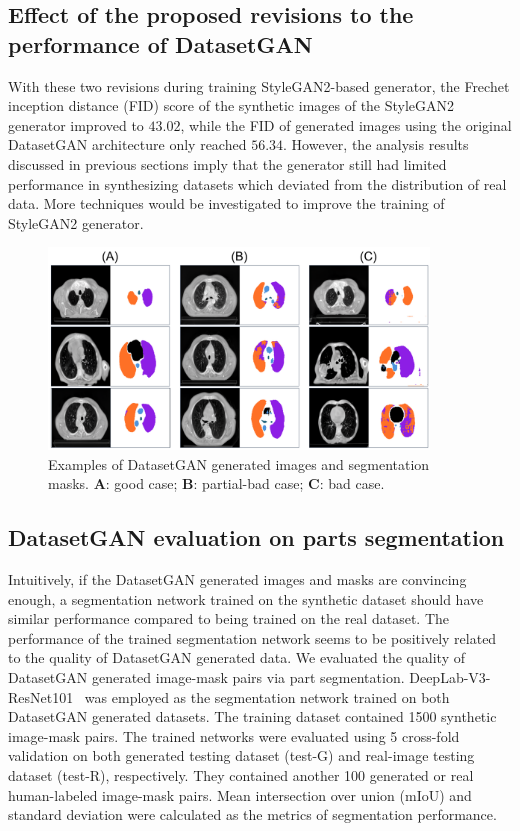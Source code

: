 \documentclass[conference]{IEEEtran}
\begin{document}
\subsection{Effect of the proposed revisions to the performance of DatasetGAN}
\label{sec:abl_datasetgan}
With these two revisions during training StyleGAN2-based generator, the Frechet inception distance (FID) score of the synthetic images of the StyleGAN2 generator improved to $43.02$, while the FID of generated images using the original DatasetGAN architecture only reached $56.34$.
However, the analysis results discussed in previous sections imply that the generator still had limited performance in synthesizing datasets which deviated from the distribution of real data. More techniques would be investigated to improve the training of StyleGAN2 generator.

\begin{figure}[h]
  \centering
  \includegraphics[width=0.9\textwidth]{./fig/generated_sample.png}
  \caption{Examples of DatasetGAN generated images and segmentation masks. \textbf{A}: good case; \textbf{B}: partial-bad case; \textbf{C}: bad case.}
  \label{fig:generated_data}
\end{figure}

\subsection{DatasetGAN evaluation on parts segmentation}
\label{sec:eval}
Intuitively, if the DatasetGAN generated images and masks are convincing enough, 
a segmentation network trained on the synthetic dataset should have similar performance compared to being trained on the real dataset. 
The performance of the trained segmentation network seems to be positively related to the quality of DatasetGAN generated data. 
We evaluated the quality of DatasetGAN generated image-mask pairs via part segmentation. DeepLab-V3-ResNet101~\cite{chen2017rethinking} was employed as the segmentation network trained on both DatasetGAN generated datasets. 
The training dataset contained 1500 synthetic image-mask pairs. The trained networks were evaluated using 5 cross-fold validation on both generated testing dataset (test-G) and real-image testing dataset (test-R), respectively. 
They contained another 100 generated or real human-labeled image-mask pairs. Mean intersection over union (mIoU) and standard deviation were calculated as the metrics of segmentation performance. 
\end{document}
